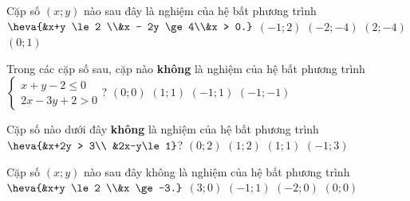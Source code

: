 \begin{ex}%
	Cặp số $(x;y)$ nào sau đây là nghiệm  của hệ bất phương trình
	$\heva{&x+y \le 2 \\&x - 2y \ge  4\\&x > 0.}$
	\choice 
		 {$(-1;2)$}
		{$(-2;-4)$} 
		{\True $(2;-4)$} 
		 {$(0;1)$}
\end{ex}

\begin{ex}%
	Trong các cặp số sau, cặp nào \textbf{không} là nghiệm của hệ bất phương trình $\left\{\begin{array}{c}{x+y-2\le 0} \\ {2x-3y+2> 0}
\end{array}\right.$?
\choice 
	 {$\left(0; 0\right)$}
	{$\left(1;  1\right)$}
	{\True $\left(-1; 1\right)$} 
	 {$\left(-1;-1\right)$}
\end{ex}

\begin{ex}%
	Cặp số nào dưới đây \textbf{không} là nghiệm  của hệ bất phương trình $\heva{&x+2y > 3\\
	&2x-y\le  1}$?
	\choice 
		{$\left(0;2\right)$} 
		{$\left(1;2\right)$} 
		 {\True $\left(1;1\right)$}
		{$\left(-1;3\right)$} 
\end{ex}

\begin{ex}%
	Cặp  số $(x;y)$ nào sau đây không là nghiệm của hệ bất phương trình
	$\heva{&x+y \le 2 \\&x \ge -3.}$ 
	 \choice
		{\True  $(3;0)$}
		 {$(-1;1)$}
		{$(-2;0)$} 
		{$(0;0)$} 
\end{ex}

